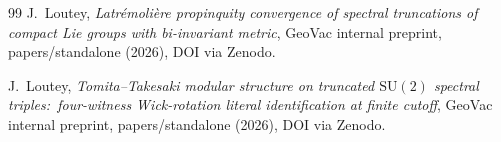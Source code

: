 \documentclass[11pt,a4paper]{article}
\theoremstyle{plain}
\theoremstyle{definition}
\newcommand{\SU}{\mathrm{SU}}
\begin{document}
\begin{thebibliography}{99}
J.~Loutey,
\newblock \emph{Latr\'emoli\`ere propinquity convergence of spectral
truncations of compact Lie groups with bi-invariant metric},
\newblock GeoVac internal preprint, papers/standalone (2026),
DOI via Zenodo.

J.~Loutey,
\newblock \emph{Tomita--Takesaki modular structure on truncated
$\SU(2)$ spectral triples:\ four-witness Wick-rotation literal
identification at finite cutoff},
\newblock GeoVac internal preprint, papers/standalone (2026),
DOI via Zenodo.

\end{thebibliography}
\end{document}
